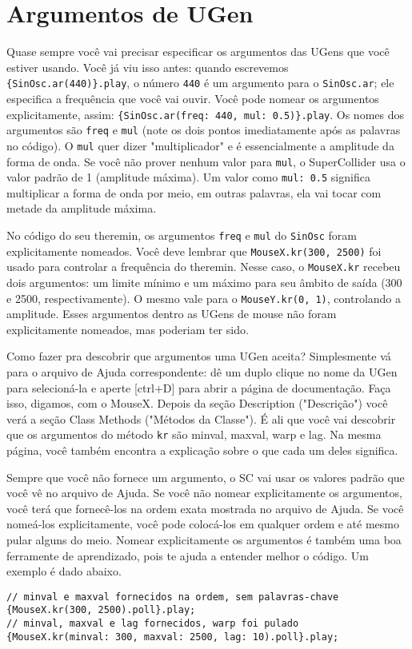 \section{Argumentos de UGen}

Quase sempre você vai precisar especificar os argumentos das UGens que você estiver usando. Você já viu isso antes: quando escrevemos \texttt{\{SinOsc.ar(440)\}.play}, o número \texttt{440} é um argumento para o \texttt{SinOsc.ar}; ele especifica a frequência que você vai ouvir. Você pode nomear os argumentos explicitamente, assim: \texttt{\{SinOsc.ar(freq: 440, mul: 0.5)\}.play}. Os nomes dos argumentos são \texttt{freq} e \texttt{mul} (note os dois pontos imediatamente após as palavras no código). O \texttt{mul} quer dizer "multiplicador" e é essencialmente a amplitude da forma de onda. Se você não prover nenhum valor para \texttt{mul}, o SuperCollider usa o valor padrão de 1 (amplitude máxima). Um valor como \texttt{mul: 0.5} significa multiplicar a forma de onda por meio, em outras palavras, ela vai tocar com metade da amplitude máxima.

No código do seu theremin, os argumentos \texttt{freq} e \texttt{mul} do \texttt{SinOsc} foram explicitamente nomeados. Você deve lembrar que \texttt{MouseX.kr(300, 2500)} foi usado para controlar a frequência do theremin. Nesse caso, o \texttt{MouseX.kr} recebeu dois argumentos: um limite mínimo e um máximo para seu âmbito de saída (300 e 2500, respectivamente). O mesmo vale para o \texttt{MouseY.kr(0, 1)}, controlando a amplitude. Esses argumentos dentro as UGens de mouse não foram explicitamente nomeados, mas poderiam ter sido.

Como fazer pra descobrir que argumentos uma UGen aceita? Simplesmente vá para o arquivo de Ajuda correspondente: dê um duplo clique no nome da UGen para selecioná-la e aperte [ctrl+D] para abrir a página de documentação. Faça isso, digamos, com o MouseX. Depois da seção Description ("Descrição") você verá a seção Class Methods ("Métodos da Classe"). É ali que você vai descobrir que os argumentos do método \texttt{kr} são minval, maxval, warp e lag. Na mesma página, você também encontra a explicação sobre o que cada um deles significa.

Sempre que você não fornece um argumento, o SC vai usar os valores padrão que você vê no arquivo de Ajuda. Se você não nomear explicitamente os argumentos, você terá que fornecê-los na ordem exata mostrada no arquivo de Ajuda. Se você nomeá-los explicitamente, você pode colocá-los em qualquer ordem e até mesmo pular alguns do meio. Nomear explicitamente os argumentos é também uma boa ferramente de aprendizado, pois te ajuda a entender melhor o código. Um exemplo é dado abaixo.

\begin{lstlisting}[style=SuperCollider-IDE, basicstyle=\scttfamily\footnotesize]
// minval e maxval fornecidos na ordem, sem palavras-chave
{MouseX.kr(300, 2500).poll}.play;
// minval, maxval e lag fornecidos, warp foi pulado
{MouseX.kr(minval: 300, maxval: 2500, lag: 10).poll}.play;
\end{lstlisting}

